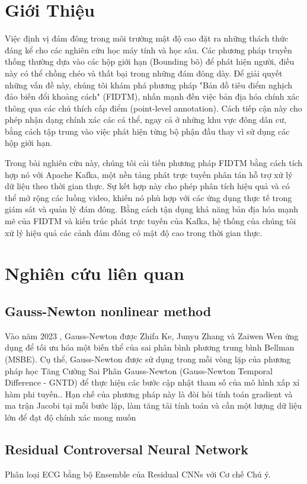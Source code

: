 \documentclass[conference]{IEEEtran}
\begin{document}
\section{Giới Thiệu}
Việc định vị đám đông trong môi trường mật độ cao đặt ra những thách thức đáng kể cho các nghiên cứu học máy tính và học sâu. Các phương pháp truyền thống thường dựa vào các hộp giới hạn (Bounding bõ) để phát hiện người, điều này có thể chồng chéo và thất bại trong những đám đông dày. Để giải quyết những vấn đề này, chúng tôi khám phá phương pháp "Bản đồ tiêu điểm nghịch đảo biến đổi khoảng cách" (FIDTM), nhấn mạnh đến việc bản địa hóa chính xác thông qua các chú thích cấp điểm (point-level annotation). Cách tiếp cận này cho phép nhận dạng chính xác các cá thể, ngay cả ở những khu vực đông dân cư, bằng cách tập trung vào việc phát hiện từng bộ phận đầu thay vì sử dụng các hộp giới hạn.

Trong bài nghiên cứu này, chúng tôi cải tiến phương pháp FIDTM bằng cách tích hợp nó với Apache Kafka, một nền tảng phát trực tuyến phân tán hỗ trợ xử lý dữ liệu theo thời gian thực. Sự kết hợp này cho phép phân tích hiệu quả và có thể mở rộng các luồng video, khiến nó phù hợp với các ứng dụng thực tế trong giám sát và quản lý đám đông. Bằng cách tận dụng khả năng bản địa hóa mạnh mẽ của FIDTM và kiến trúc phát trực tuyến của Kafka, hệ thống của chúng tôi xử lý hiệu quả các cảnh đám đông có mật độ cao trong thời gian thực.

\section{Nghiên cứu liên quan}

\subsection{Gauss-Newton nonlinear method}

Vào năm 2023 , Gauss-Newton được Zhifa Ke, Junyu Zhang và Zaiwen Wen ứng dụng để tối ưu hóa một biến thể của sai phân bình phương trung bình Bellman (MSBE). Cụ thể, Gauss-Newton được sử dụng trong mỗi vòng lặp của phương pháp học Tăng Cường Sai Phân Gauss-Newton (Gauss-Newton Temporal Difference - GNTD) để thực hiện các bước cập nhật tham số của mô hình xấp xỉ hàm phi tuyến.\cite{gaussnewtonrelated}. Hạn chế của phương pháp này là đòi hỏi tính toán gradient và ma trận Jacobi tại mỗi bước lặp, làm tăng tải tính toán và cần một lượng dữ liệu lớn để đạt độ chính xác mong muốn

\subsection{Residual Controversal Neural Network}
Phân loại ECG bằng bộ Ensemble của Residual CNNs với Cơ chế Chú ý.
\end{document}
